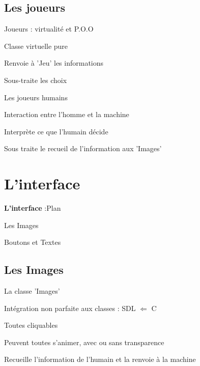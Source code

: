 \documentclass[c,12pt]{beamer}
\begin{document}
	\subsection{Les joueurs}
\begin{frame}{Joueurs : virtualité et P.O.O}
\begin{itemize}
	 {\item Classe virtuelle pure}
	\newline
	 {\item Renvoie à 'Jeu' les informations}
	\newline
	 {\item Sous-traite les choix}
\end{itemize}
\end{frame}

\begin{frame}{Les joueurs humains}
\begin{itemize}
	 {\item Interaction entre l'homme et la machine}
	\newline
	 {\item Interprète ce que l'humain décide}
	\newline
	 {\item Sous traite le recueil de l'information aux 'Images'}
\end{itemize}
\end{frame}

\section{L'interface}
\begin{frame}{\textbf{L'interface} :Plan}
\begin{itemize}
	 {\item Les Images}
	\newline
	 {\item Boutons et Textes}
\end{itemize}
\end{frame}
	\subsection{Les Images}
\begin{frame}{La classe 'Images'}
\begin{itemize}
	 {\item Intégration non parfaite aux classes : SDL $\Leftarrow$ C}
	\newline
	 {\item Toutes cliquables}
	\newline
	 {\item Peuvent toutes s'animer, avec ou sans transparence}
	\newline
	 {\item Recueille l'information de l'humain et la renvoie à la machine}
\end{itemize}
\end{frame}
\end{document}

